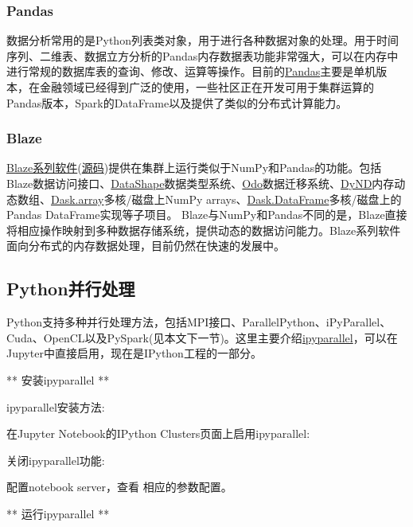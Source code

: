 \documentclass[letterpaper,10pt,english]{sphinxmanual}
\begin{document}
\subsubsection{Pandas}
\label{gispark_paas:Pandas}
数据分析常用的是Python列表类对象，用于进行各种数据对象的处理。用于时间序列、二维表、数据立方分析的Pandas内存数据表功能非常强大，可以在内存中进行常规的数据库表的查询、修改、运算等操作。目前的\href{http://pandas.pydata.org}{Pandas}主要是单机版本，在金融领域已经得到广泛的使用，一些社区正在开发可用于集群运算的Pandas版本，Spark的DataFrame以及提供了类似的分布式计算能力。


\subsubsection{Blaze}
\label{gispark_paas:Blaze}
\href{https://blaze.readthedocs.io/en/latest/}{Blaze系列软件}(\href{https://github.com/blaze}{源码})提供在集群上运行类似于NumPy和Pandas的功能。包括Blaze数据访问接口、\href{http://datashape.pydata.org/}{DataShape}数据类型系统、\href{http://odo.pydata.org/}{Odo}数据迁移系统、\href{https://github.com/libdynd/libdynd}{DyND}内存动态数组、\href{http://dask.pydata.org/}{Dask.array}多核/磁盘上NumPy
arrays、\href{http://dask.pydata.org/}{Dask.DataFrame}多核/磁盘上的Pandas
DataFrame实现等子项目。
Blaze与NumPy和Pandas不同的是，Blaze直接将相应操作映射到多种数据存储系统，提供动态的数据访问能力。Blaze系列软件面向分布式的内存数据处理，目前仍然在快速的发展中。


\subsection{Python并行处理}
\label{gispark_paas:Python_u5e76_u884c_u5904_u7406}
Python支持多种并行处理方法，包括MPI接口、ParallelPython、iPyParallel、Cuda、OpenCL以及PySpark(见本文下一节)。这里主要介绍\href{https://github.com/ipython/ipyparallel}{ipyparallel}，可以在Jupyter中直接启用，现在是IPython工程的一部分。

** 安装ipyparallel **

ipyparallel安装方法: 

在Jupyter Notebook的IPython Clusters页面上启用ipyparallel:

关闭ipyparallel功能: 

配置notebook server，查看 
相应的参数配置。

** 运行ipyparallel **
\end{document}
